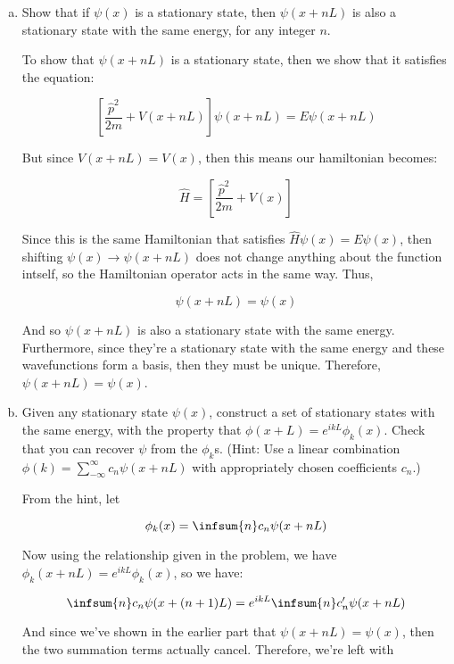\documentclass{article}
\begin{document}
    \begin{enumerate}[(a)]
        \item Show that if $\psi(x)$ is a stationary state, then $\psi(x + nL)$ is also a stationary state with the same energy, for any integer $n$.
        
        \begin{solution}
            To show that $\psi(x + nL)$ is a stationary state, then we show that it satisfies the \schrodinger equation:

            \[ \left[\frac{\hat p^2}{2m} + V(x + nL) \right] \psi(x+nL) = E \psi(x + nL)\]


            But since $V(x + nL) = V(x)$, then this means our hamiltonian becomes:

            \[ \hat H = \left[\frac{\hat p^2}{2m} + V(x) \right]\]

            Since this is the same Hamiltonian that satisfies $\hat H \psi(x) = E\psi(x)$, then shifting $\psi(x) \to \psi(x + nL)$ does not change anything about the function intself, so the Hamiltonian operator acts in the same way. Thus,

            \[  \psi(x + nL) = \psi(x)\] 

            And so $\psi(x + nL)$ is also a stationary state with the same energy. Furthermore, since they're a stationary state with the same energy and these wavefunctions form a basis, then they must be unique. Therefore, $\psi(x + nL) = \psi(x)$.
        \end{solution}


        \item Given any stationary state $\psi(x)$, construct a set of stationary states with the same energy, with the property that $\phi(x + L) = e^{ikL}\phi_k(x)$. Check that you can recover $\psi$ from the $\phi_k$s. (Hint: Use a linear combination $\phi(k) = \sum_{-\infty}^\infty c_n \psi(x + nL)$ with appropriately chosen coefficients $c_n$.)
        
        \begin{solution}
            From the hint, let 

            \[ \phi_k(x) = \infsum{n} c_n \psi(x + nL)\]

            Now using the relationship given in the problem, we have $\phi_k(x + nL) = e^{ikL}\phi_k(x)$, so we have: 
            
            \[ \infsum{n} c_n \psi(x + (n + 1)L) = e^{ikL}\infsum{n} c_n' \psi(x + nL)\]

            And since we've shown in the earlier part that $\psi(x + nL) = \psi(x)$, then the two summation terms actually cancel. Therefore, we're left with 


\end{solution}
\end{enumerate}
\end{document}
